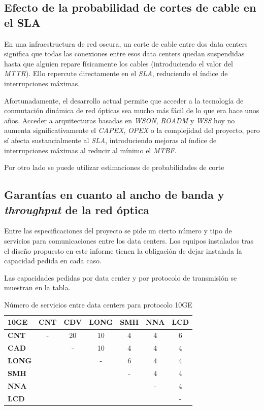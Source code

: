 \subsection{Efecto de la probabilidad de cortes de cable en el SLA}
\label{sec:cortes}

En una infraestructura de red oscura, un corte de cable entre dos data
centers significa que todas las conexiones entre esos data centers
quedan suspendidas hasta que alguien repare físicamente los cables
(introduciendo el valor del \emph{MTTR}). Ello repercute directamente
en el \emph{SLA}, reduciendo el índice de interrupciones máximas.

Afortunadamente, el desarrollo actual permite que acceder a la
tecnología de conmutación dinámica de red ópticas sea mucho más fácil
de lo que era hace unos años. Acceder a arquitecturas basadas en
\emph{WSON}, \emph{ROADM} y \emph{WSS} hoy no aumenta
significativamente el \emph{CAPEX}, \emph{OPEX} o la complejidad del
proyecto, pero sí afecta sustancialmente al \emph{SLA}, introduciendo
mejoras al índice de interrupciones máximas al reducir al mínimo el
\emph{MTBF}.

Por otro lado se puede utilizar estimaciones de probabilidades de corte

\subsection{Garantías en cuanto al ancho de banda y \emph{throughput}
  de la red óptica}
\label{sec:anchodebanda}

Entre las especificaciones del proyecto se pide un cierto número y
tipo de servicios para comunicaciones entre los data centers. Los
equipos instalados tras el diseño propuesto en este informe tienen la
obligación de dejar instalada la capacidad pedida en cada caso.

Las capacidades pedidas por data center y por protocolo de
transmisión se muestran en la tabla.

\begin{table}[H]
  \centering
  \begin{tabular}{| l | c | c | c | c | c | c |}
    \hline
    \textbf{10GE} & \textbf{CNT} & \textbf{CDV} & \textbf{LONG} & \textbf{SMH} & \textbf{NNA} & \textbf{LCD} \\
    \hline
    \textbf{CNT}  & - & 20 & 10 & 4 & 4 & 6 \\
    \hline
    \textbf{CAD}  &   & - & 10 & 4 & 4 & 4 \\
    \hline
    \textbf{LONG} &   &   & - & 6 & 4 & 4 \\
    \hline
    \textbf{SMH}  &   &   &   & - & 4 & 4 \\
    \hline
    \textbf{NNA}  &   &   &   &   & - & 4 \\
    \hline
    \textbf{LCD}  &   &   &   &   &   & - \\
    \hline
  \end{tabular}
  \caption{Número de servicios entre data centers para protocolo 10GE}
  \label{tab:10ge}
\end{table}

